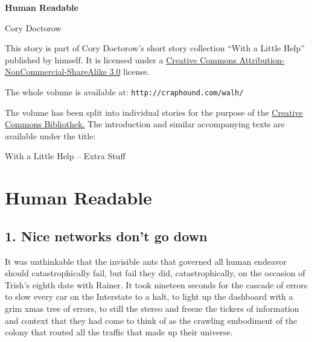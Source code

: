 


\raggedbottom

\begin{center}
\textbf{\huge\textsf{Human Readable}}

\medskip
Cory Doctorow

\end{center}

\bigskip

\begin{flushleft}
This story is part of Cory Doctorow’s short story collection
“With a Little Help” published by himself. It is licensed under a
\href{http://creativecommons.org/licenses/by-nc-sa/}
{Creative Commons Attribution-NonCommercial-ShareAlike 3.0} license.

\bigskip

The whole volume is available at:
\texttt{http://craphound.com/walh/}

\medskip

The volume has been split into individual stories for the purpose of the
\href{http://ccbib.org}{Creative Commons Bibliothek.}
The introduction and similar accompanying texts are available under the 
title:
\end{flushleft}
\begin{center}
With a Little Help -- Extra Stuff
\end{center}

\newpage

\section{Human Readable}

\subsection{1. Nice networks don't go down}

It was unthinkable that the invisible ants that governed all human 
endeavor should catastrophically fail, but fail they did, 
catastrophically, on the occasion of Trish's eighth date with Rainer. 
It took nineteen seconds for the cascade of errors to slow every car on 
the Interstate to a halt, to light up the dashboard with a grim xmas 
tree of errors, to still the stereo and freeze the tickers of 
information and context that they had come to think of as the crawling 
embodiment of the colony that routed all the traffic that made up their 
universe.

